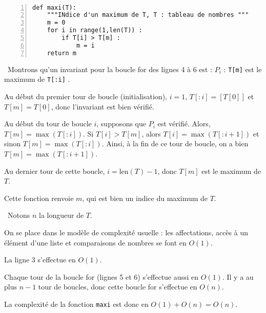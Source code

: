 \question\

\begin{Verbatim}[gobble=0,numbers=left]
def maxi(T):
    """INdice d'un maximum de T, T : tableau de nombres """
    m = 0
    for i in range(1,len(T)) : 
        if T[i] > T[m] :
            m = i
    return m 
\end{Verbatim}

\question\ Montrons qu'un invariant pour la boucle for des lignes 4 à 6 est : $P_i$ : \og \texttt{T[m]} est le maximum 
de \texttt{T[:i]} \fg. 

Au début du premier tour de boucle (initialisation), $i = 1$, $T[:i] = [T[0]]$ et $T[m] = T[0]$, donc l'invariant est  
bien vérifié. 

Au début du tour de boucle \no$i$, supposons que $P_i$ est vérifié. Alors, $T[m] = \max(T[:i])$. Si $T[i] > T[m]$, 
alors $T[i] = \max(T[:i+1])$ et sinon $T[m] = \max(T[:i])$. 
Ainsi, à la fin de ce tour de boucle, on a bien $T[m] = \max(T[:i+1])$. 

Au dernier tour de cette boucle, $i = \mathrm{len}(T)-1$, donc $T[m]$ est le maximum de $T$.

Cette fonction renvoie $m$, qui est bien un indice du maximum de $T$. 

\question\ Notons $n$ la longueur de $T$. 

On se place dans le modèle de complexité usuelle : les affectations, accès à un élément d'une liste et comparaisons de nombres se font en $O(1)$. 

La ligne 3 s'effectue en $O(1)$. 

Chaque tour de la boucle for (lignes 5 et 6) s'effectue aussi en $O(1)$. Il y a au plus $n-1$ tour de boucles, donc cette boucle for s'effectue en $O(n)$. 

La complexité de la fonction \texttt{maxi} est donc en $O(1)+O(n) = O(n)$. 